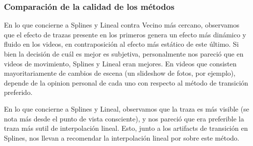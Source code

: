 %

\subsubsection{Comparaci\'on de la calidad de los m\'etodos}
\par En lo que concierne a Splines y Lineal contra Vecino m\'as cercano, observamos que el efecto de trazas presente en los primeros genera un efecto m\'as din\'amico y fluido en los videos, en contraposici\'on al efecto m\'as est\'atico de este \'ultimo.
Si bien la decisi\'on de cu\'al es mejor es subjetiva, personalmente nos pareci\'o que en videos de movimiento, Splines y Lineal eran mejores.
En videos que consisten mayoritariamente de cambios de escena (un slideshow de fotos, por ejemplo), depende de la opinion personal de cada uno con respecto al m\'etodo de transici\'on preferido.
\par En lo que concierne a Splines y Lineal, observamos que la traza es m\'as visible (se nota m\'as desde el punto de vista consciente), y nos pareci\'o que era preferible la traza m\'as sutil de interpolaci\'on lineal.
Esto, junto a los artifacts de transici\'on en Splines, nos llevan a recomendar la interpolaci\'on lineal por sobre este m\'etodo.
